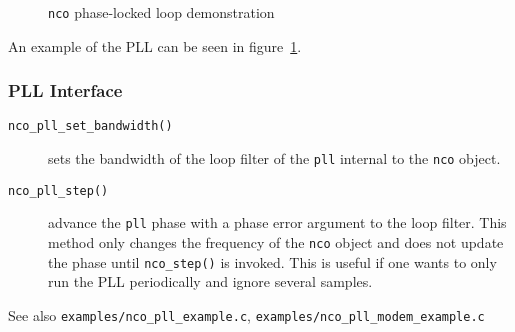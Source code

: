 \begin{figure}
\centering
{}
\caption{{\tt nco} phase-locked loop demonstration}
\label{fig:module:nco:pll}
\end{figure}

An example of the PLL can be seen in figure~\ref{fig:module:nco:pll}.

\subsubsection{PLL Interface}
\begin{description}
\item[{\tt nco\_pll\_set\_bandwidth()}]
    sets the bandwidth of the loop filter of the {\tt pll} internal to the
    {\tt nco} object.
\item[{\tt nco\_pll\_step()}]
    advance the {\tt pll} phase with a phase error argument to the loop
    filter.
    This method only changes the frequency of the {\tt nco} object and does
    not update the phase until {\tt nco\_step()} is invoked.
    This is useful if one wants to only run the PLL periodically and ignore
    several samples.
\end{description}

See also
{\tt examples/nco\_pll\_example.c},
{\tt examples/nco\_pll\_modem\_example.c}

